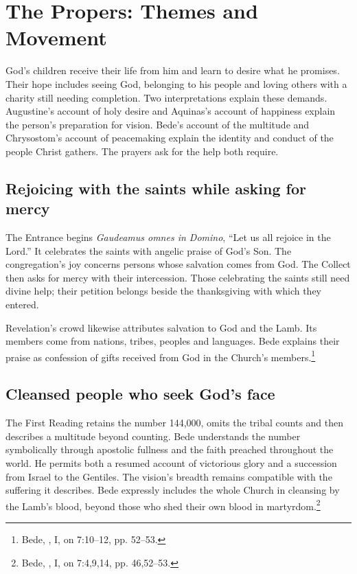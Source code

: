 \newpage
\section{The Propers: Themes and Movement}
God's children receive their life from him and learn to desire what he promises. Their hope includes seeing God, belonging to his people and loving others with a charity still needing completion. Two interpretations explain these demands. Augustine's account of holy desire and Aquinas's account of happiness explain the person's preparation for vision. Bede's account of the multitude and Chrysostom's account of peacemaking explain the identity and conduct of the people Christ gathers. The prayers ask for the help both require.

\subsection{Rejoicing with the saints while asking for mercy}
The Entrance begins \textit{Gaudeamus omnes in Domino}, ``Let us all rejoice in the Lord.'' It celebrates the saints with angelic praise of God's Son. The congregation's joy concerns persons whose salvation comes from God. The Collect then asks for mercy with their intercession. Those celebrating the saints still need divine help; their petition belongs beside the thanksgiving with which they entered.

Revelation's crowd likewise attributes salvation to God and the Lamb. Its members come from nations, tribes, peoples and languages. Bede explains their praise as confession of gifts received from God in the Church's members.\footnote{Bede, , I, on 7:10--12, pp. 52--53.}

\subsection{Cleansed people who seek God's face}
The First Reading retains the number 144,000, omits the tribal counts and then describes a multitude beyond counting. Bede understands the number symbolically through apostolic fullness and the faith preached throughout the world. He permits both a resumed account of victorious glory and a succession from Israel to the Gentiles. The vision's breadth remains compatible with the suffering it describes. Bede expressly includes the whole Church in cleansing by the Lamb's blood, beyond those who shed their own blood in martyrdom.\footnote{Bede, , I, on 7:4,9,14, pp. 46,52--53.}

